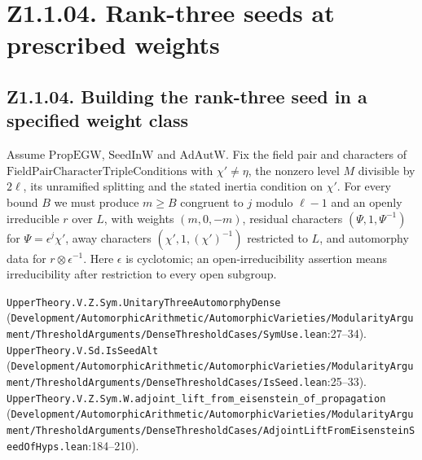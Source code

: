 \section*{Z1.1.04. Rank-three seeds at prescribed weights}

\subsection{Z1.1.04. Building the rank-three seed in a specified weight class}\label{r5:Z1.1.04}
Assume $\mathrm{PropEGW}$, $\mathrm{SeedInW}$ and $\mathrm{AdAutW}$. Fix the field pair and characters of $\mathrm{FieldPairCharacterTripleConditions}$ with $\chi'\ne\eta$, the nonzero level $M$ divisible by $2\ell$, its unramified splitting and the stated inertia condition on $\chi'$. For every bound $B$ we must produce $m\ge B$ congruent to $j$ modulo $\ell-1$ and an openly irreducible $r$ over $L$, with weights $(m,0,-m)$, residual characters $(\Psi,1,\Psi^{-1})$ for $\Psi=\epsilon^j\chi'$, away characters $(\chi',1,(\chi')^{-1})$ restricted to $L$, and automorphy data for $r\otimes\epsilon^{-1}$. Here $\epsilon$ is cyclotomic; an open-irreducibility assertion means irreducibility after restriction to every open subgroup.

{\footnotesize \nolinkurl{UpperTheory.V.Z.Sym.UnitaryThreeAutomorphyDense} (\nolinkurl{Development/AutomorphicArithmetic/AutomorphicVarieties/ModularityArgument/ThresholdArguments/DenseThresholdCases/SymUse.lean}\allowbreak:27--34). \nolinkurl{UpperTheory.V.Sd.IsSeedAlt} (\nolinkurl{Development/AutomorphicArithmetic/AutomorphicVarieties/ModularityArgument/ThresholdArguments/DenseThresholdCases/IsSeed.lean}\allowbreak:25--33). \nolinkurl{UpperTheory.V.Z.Sym.W.adjoint_lift_from_eisenstein_of_propagation} (\nolinkurl{Development/AutomorphicArithmetic/AutomorphicVarieties/ModularityArgument/ThresholdArguments/DenseThresholdCases/AdjointLiftFromEisensteinSeedOfHyps.lean}\allowbreak:184--210).}

